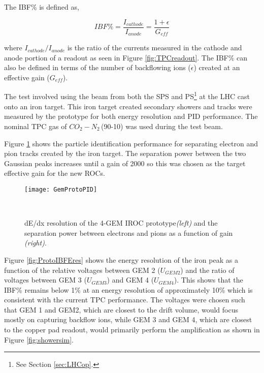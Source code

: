 The IBF\% is defined as,

\begin{equation}
IBF \% = \frac{ I_{cathode} }{ I_{anode} } = \frac{1 + \epsilon }{ G_{eff} }
\label{eq:IBF}
\end{equation}

\noindent
where $ I_{cathode} / I_{anode}$ is the ratio of the currents measured in the cathode and anode portion of a readout as seen in Figure \ref{fig:TPCreadout}.  The IBF\% can also be defined in terms of the number of backflowing ions ($\epsilon$) created at an effective gain ($G_{eff}$).  

The test involved using the beam from both the SPS and PS\footnote{See Section \ref{sec:LHCop}.} at the LHC cast onto an iron target.  This iron target created secondary showers and tracks were measured by the prototype for both energy resolution and PID performance.  The nominal TPC gas of $CO_{2}-N_{2}\,$(90-10) was used during the test beam.  

Figure \ref{fig:GemProtoPID} shows the particle identification performance for separating electron and pion tracks created by the iron target.  The separation power between the two Gaussian peaks increases until a gain of 2000 so this was chosen as the target effective gain for the new ROCs.

\begin{figure}[b!]
\texttt{[image: GemProtoPID]}
\centering
\caption{dE/dx resolution of the 4-GEM IROC prototype\textit{(left)} and the separation power between electrons and pions as a function of gain \textit{(right)}\cite{CERN-LHCC-2015-002}.}\
\label{fig:GemProtoPID}
\end{figure}


Figure \ref{fig:ProtoIBFEres} shows the energy resolution of the iron peak as a function of the relative voltages between GEM 2 ($U_{GEM2}$) and the ratio of voltages between GEM 3 ($U_{GEM3}$) and GEM 4 ($U_{GEM4}$).  This shows that the IBF\% remains below 1\% at an energy resolution of approximately 10\% which is consistent with the current TPC performance.  The voltages were chosen such that GEM 1 and GEM2, which are closest to the drift volume, would focus mostly on capturing backflow ions, while GEM 3 and GEM 4, which are closest to the copper pad readout, would primarily perform the amplification as shown in Figure \ref{fig:showersim}.


